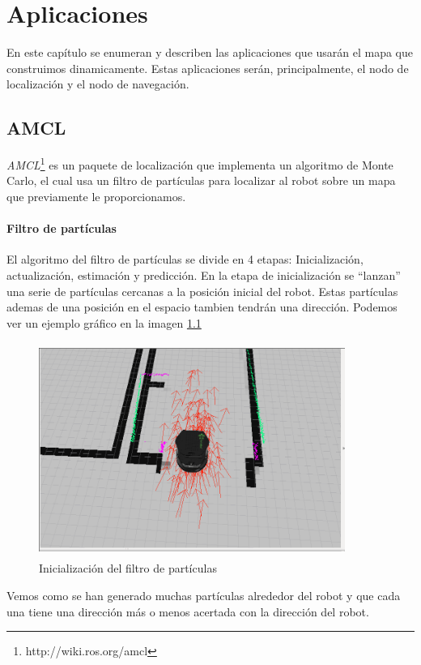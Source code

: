 \chapter{Aplicaciones}
\label{cap:aplicaciones}

En este capítulo se enumeran y describen las aplicaciones que usarán el mapa que construimos dinamicamente. Estas aplicaciones serán, principalmente, el nodo de localización y el nodo de navegación.

\section{AMCL}
\label{sec:amcl}
\textit{AMCL}\footnote{http://wiki.ros.org/amcl} es un paquete de localización que implementa un algoritmo de Monte Carlo, el cual usa un filtro de partículas para localizar al robot sobre un mapa que previamente le proporcionamos.
\subsubsection{Filtro de partículas}
El algoritmo del filtro de partículas se divide en 4 etapas: Inicialización, actualización, estimación y predicción. 
En la etapa de inicialización se ``lanzan'' una serie de partículas cercanas a la posición inicial del robot. Estas partículas ademas de una posición en el espacio tambien tendrán una dirección. Podemos ver un ejemplo gráfico en la imagen \ref{fig:initamcl}

\begin{figure}[hbtp]
  \begin{center}
    \includegraphics[width=10cm,height=7cm]{img/cap5/initamcl}
  \end{center}
  \caption{Inicialización del filtro de partículas}
  \label{fig:initamcl}
\end{figure}
Vemos como se han generado muchas partículas alrededor del robot y que cada una tiene una dirección más o menos acertada con la dirección del robot.


